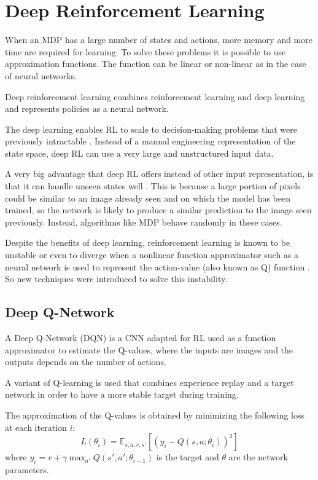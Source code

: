 \section{Deep Reinforcement Learning}
\label{sec:drl}
When an MDP has a large number of states and actions, more memory and more time are required for learning.
To solve these problems it is possible to use approximation functions.
The function can be linear \cite{melo2008analysis} or non-linear as in the case of neural networks.

Deep reinforcement learning \cite{arulkumaran2017deep} combines reinforcement learning and deep learning and represents policies as a neural network.

The deep learning enables RL to scale to decision-making problems that were previously intractable \cite{arulkumaran2017deep}.
Instead of a manual engineering representation of the state space, deep RL can use a very large and unstructured input data.

A very big advantage that deep RL offers instead of other input representation,
is that it can handle unseen states well \cite{mnih2013playing} \cite{karpathy2016deep}.
This is because a large portion of pixels could be similar to an image already seen and on which the model has been trained, so the network is likely to produce a similar prediction to the image seen previously. Instead, algorithms like MDP behave randomly in these cases.

Despite the benefits of deep learning, reinforcement learning is known to be unstable or even to diverge when a nonlinear function approximator such as a neural network is used to represent the action-value (also known as Q) function \cite{mnih2015human}.
So new techniques were introduced to solve this instability.

\subsection{Deep Q-Network}
A Deep Q-Network (DQN) \cite{mnih2013playing} is a CNN adapted for RL used as a function approximator to estimate the Q-values,
where the inputs are images and the outputs depends on the number of actions.

A variant of Q-learning is used that combines experience replay and a target network in order to have a more stable target during training. 

The approximation of the Q-values is obtained by minimizing the following loss at each iteration $i$:
\begin{equation}
    L(\theta_i) = \mathbb{E}_{s, a, r, s'} [ ( y_i - Q(s, a; \theta_i))^2 ]
\end{equation}
where $y_i = r + \gamma \max_{a'} Q(s', a'; \theta_{i-1})$ is the target and $\theta$ are the network parameters.

